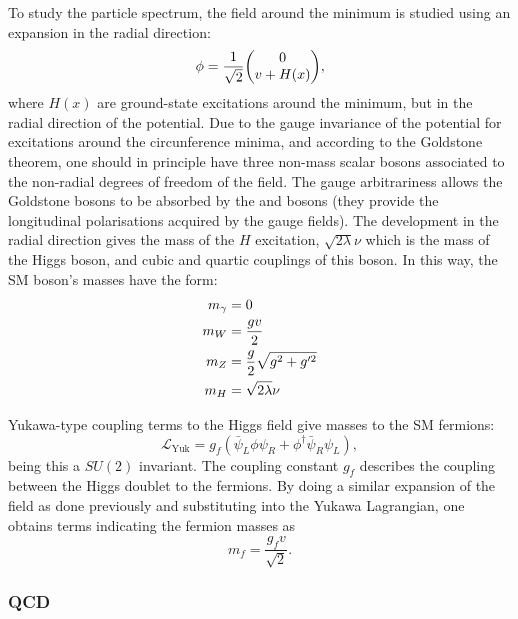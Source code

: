 To study the particle spectrum, the field around the minimum is studied using an expansion in the radial direction:
\begin{equation}
    \phi = \frac{1}{\sqrt{2}} \mqty(0 \\ v + H(x)),
\end{equation}
where \(H(x)\) are ground-state excitations around the minimum, but in the radial direction of the potential.
Due to the gauge invariance of the potential for excitations around the circunference minima, and according to the Goldstone theorem, one should in principle have three non-mass scalar bosons associated to the non-radial degrees of freedom of the field. The gauge arbitrariness allows the Goldstone bosons to be absorbed by the \Wboson and \Zboson bosons (they provide the longitudinal polarisations acquired by the gauge fields). The development in the radial direction gives the mass of the \(H\) excitation, \(\sqrt{2\lambda}\nu\) which is the mass of the Higgs boson, and cubic and quartic couplings of this boson. In this way, the \ac{SM} boson's masses have the form:
\begin{align}
    m_{\gamma} &= 0\\
    m_{W} & = \frac{g v}{2}\\
    m_{Z} & = \frac{g}{2} \sqrt{g^2 + g'^2}\\
    m_{H} & = \sqrt{2\lambda}\nu
\end{align}

Yukawa-type coupling terms to the Higgs field give masses to the \ac{SM} fermions:
\begin{equation}
    \mathcal{L}_{\text{Yuk}} = g_f \left(\bar{\psi}_L \phi \psi_R + \phi^{\dagger} \bar{\psi}_R \psi_L\right),
\end{equation}
being this a \(SU(2)\) invariant. The coupling constant \(g_f\) describes the coupling between the Higgs doublet to the fermions. By doing a similar expansion of the field as done previously and substituting into the Yukawa Lagrangian, one obtains terms indicating the fermion masses as
\begin{equation}
    m_f = \frac{g_f v}{\sqrt{2}}.
\end{equation}




\subsubsection{\acf{QCD}}
\label{subsubsec:theory:sm:mathematical:qcd}

